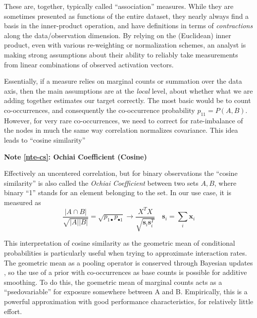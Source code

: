 \documentclass[%
	12pt,
		oneside,
		letterpaper
]{book}
\newcounter{quartocalloutnteno}
\newcommand{\quartocalloutnte}[1]{\refstepcounter{quartocalloutnteno}\label{#1}}
\begin{document}
These are, together, typically called ``association'' measures. While
they are sometimes presented as functions of the entire dataset, they
nearly always find a basis in the inner-product operation, and have
definitions in terms of \emph{contractions} along the data/observation
dimension. By relying on the (Euclidean) inner product, even with
various re-weighting or normalization schemes, an analyst is making
strong assumptions about their ability to reliably take measurements
from linear combinations of observed activation vectors.

Essentially, if a measure relies on marginal counts or summation over
the data axis, then the main assumptions are at the \emph{local} level,
about whether what we are adding together estimates our target
correctly. The most basic would be to count co-occurrences, and
consequently the co-occurrence probability \(p_{11}=P(A,B)\). However,
for very rare co-occurrences, we need to correct for rate-imbalance of
the nodes in much the same way correlation normalizes covariance. This
idea leads to ``cosine similarity''

\begin{tcolorbox}[enhanced jigsaw, opacityback=0, colback=white, breakable, rightrule=.15mm, leftrule=.75mm, arc=.35mm, colframe=quarto-callout-note-color-frame, bottomrule=.15mm, toprule=.15mm, left=2mm]

\quartocalloutnte{nte-cs} 

\vspace{-3mm}\textbf{Note \ref*{nte-cs}: Ochiai Coefficient (Cosine)}\vspace{3mm}

Effectively an uncentered correlation, but for binary observations the
``cosine similarity'' is also called the \emph{Ochiai Coefficient}
between two sets \(A,B\), where binary ``1'' stands for an element
belonging to the set.\autocite{Measuresecologicalassociation_Janson1981}
In our use case, it is measured as \[
\frac{|A \cap B |}{\sqrt{|A||B|}}=\sqrt{p_{1\bullet}p_{\bullet 1}} \rightarrow  \frac{X^TX}{\sqrt{\mathbf{s}_i\mathbf{s}_i^T}}\quad \mathbf{s}_i = \sum_i \mathbf{x}_i
\]

\end{tcolorbox}

This interpretation of cosine similarity as the geometric mean of
conditional probabilities is particularly useful when trying to
approximate interaction rates. The geometric mean as a pooling operator
is conserved through Bayesian updates
\autocite{ProbabilityAggregationMethods_Allard2012}, so the use of a
prior with co-occurrences as base counts is possible for additive
smoothing. To do this, the goemetric mean of marginal counts acts as a
``psedovariable'' for exposure somewhere between A and B. Empirically,
this is a powerful approximation with good performance characteristics,
for relatively little effort.
\end{document}
